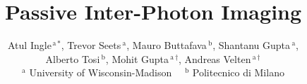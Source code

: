 \documentclass[10pt,twocolumn]{article}
\renewcommand*{\thefootnote}{\fnsymbol{footnote}}
\begin{document}
\newcommand{\mytitle}{Passive Inter-Photon Imaging}

\title{\mytitle}

\author{
  Atul Ingle$^{\,\text{a}\,\ast}$, Trevor Seets$\,^\text{a}$, Mauro Buttafava$\,^\text{b}$,
  Shantanu Gupta$\,^\text{a}$,\\
  Alberto Tosi$\,^\text{b}$, Mohit Gupta$\,^{\text{a}\,\dagger}$,
  Andreas Velten$\,^{\text{a}\,\dagger}$ \vspace{2pt} \\
  {\normalsize $^\text{a}$ University of Wisconsin-Madison} \,\,\,\,
  {\normalsize $^\text{b}$ Politecnico di Milano}
}
\date{}
\maketitle
\renewcommand*{\thefootnote}{$\dagger$}
\setcounter{footnote}{1}

\renewcommand*{\thefootnote}{\arabic{footnote}}
\setcounter{footnote}{0}


\newenvironment{myitemize}
{ \begin{itemize}
    \setlength{\itemsep}{3pt}
    \setlength{\parskip}{2pt}
    \setlength{\parsep}{3pt}     }
{ \end{itemize}                  } 









{\small


}
\end{document}
